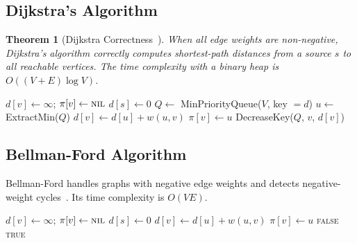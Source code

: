 \documentclass[12pt,a4paper]{article}
\newtheorem{theorem}{Theorem}[section]
\begin{document}
\subsection{Dijkstra's Algorithm}

\begin{theorem}[Dijkstra Correctness~\cite{dijkstra1959,cormen2022}]
When all edge weights are non-negative, Dijkstra's algorithm correctly
computes shortest-path distances from a source $s$ to all reachable vertices.
The time complexity with a binary heap is $O((V+E)\log V)$.
\end{theorem}

\begin{algorithm}
\caption{Dijkstra's Shortest Path~\cite{dijkstra1959}}
\begin{algorithmic}[1]
    \State $d[v] \leftarrow \infty$; $\pi[v] \leftarrow \textsc{nil}$
  \EndFor
  \State $d[s] \leftarrow 0$
  \State $Q \leftarrow$ MinPriorityQueue($V$, key $= d$)
    \State $u \leftarrow$ ExtractMin($Q$)
        \State $d[v] \leftarrow d[u] + w(u,v)$
        \State $\pi[v] \leftarrow u$
        \State DecreaseKey($Q$, $v$, $d[v]$)
      \EndIf
    \EndFor
  \EndWhile
\EndProcedure
\end{algorithmic}
\end{algorithm}

\subsection{Bellman-Ford Algorithm}

Bellman-Ford handles graphs with negative edge weights and detects
negative-weight cycles~\cite{bellman1958,cormen2022}.
Its time complexity is $O(VE)$.

\begin{algorithm}
\caption{Bellman-Ford Shortest Path~\cite{bellman1958}}
\begin{algorithmic}[1]
    \State $d[v] \leftarrow \infty$; $\pi[v] \leftarrow \textsc{nil}$
  \EndFor
  \State $d[s] \leftarrow 0$
        \State $d[v] \leftarrow d[u] + w(u,v)$
        \State $\pi[v] \leftarrow u$
      \EndIf
    \EndFor
  \EndFor
    
      \Return \textsc{false}  
    \EndIf
  \EndFor
  \Return \textsc{true}
\EndProcedure
\end{algorithmic}
\end{algorithm}
\end{document}
